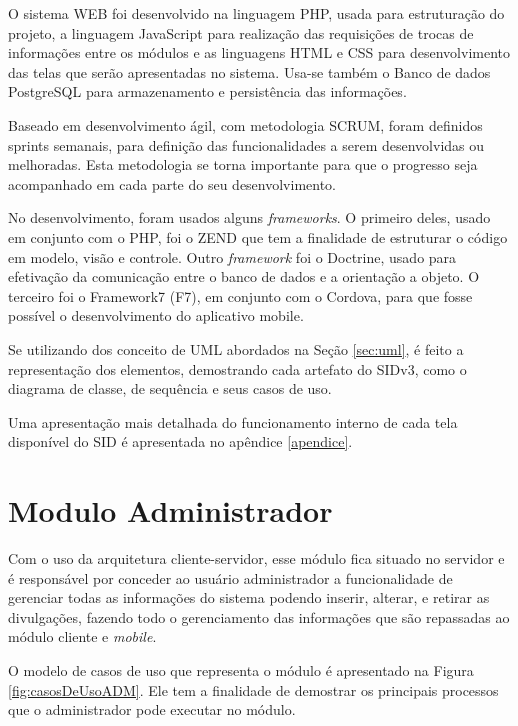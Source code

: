 O sistema WEB foi desenvolvido na linguagem PHP, usada para estruturação do projeto, a linguagem JavaScript para realização das requisições de trocas de informações entre os módulos e as linguagens HTML e CSS para desenvolvimento das telas que serão apresentadas no sistema. Usa-se também o Banco de dados PostgreSQL para armazenamento e persistência das informações.

Baseado em desenvolvimento ágil, com metodologia SCRUM, foram definidos sprints semanais, para definição das funcionalidades a serem desenvolvidas ou melhoradas. Esta metodologia se torna importante para que o progresso seja acompanhado em cada parte do seu desenvolvimento.

No desenvolvimento, foram usados alguns \textit{frameworks}. O primeiro deles, usado em conjunto com o PHP, foi o ZEND que tem a finalidade de estruturar o código em modelo, visão e controle. Outro \textit{framework} foi o Doctrine, usado para efetivação da comunicação entre o banco de dados e a orientação a objeto. O terceiro foi o Framework7 (F7), em conjunto com o Cordova, para que fosse possível o desenvolvimento do aplicativo mobile. 

Se utilizando dos conceito de UML abordados na Seção \ref{sec:uml}, é  feito a representação dos elementos, demostrando cada artefato do SIDv3, como o diagrama de classe, de sequência e seus casos de uso.

Uma apresentação mais detalhada do funcionamento interno de cada tela disponível do SID é apresentada no apêndice \ref{apendice}.

\section{Modulo Administrador}
Com o uso da arquitetura cliente-servidor, esse módulo fica situado no servidor e é responsável por conceder ao usuário administrador a funcionalidade de gerenciar todas as informações do sistema podendo inserir, alterar, e retirar as divulgações, fazendo todo o gerenciamento das informações que são repassadas ao módulo cliente e \textit{mobile}.

O modelo de casos de uso que representa o módulo é apresentado na Figura \ref{fig:casosDeUsoADM}. Ele tem a finalidade de demostrar os principais processos que o administrador pode executar no módulo.

